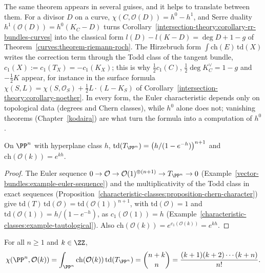 \begin{remark}\label{intersection-theory:remark-forms-of-riemann-roch}
The same theorem appears in several guises, and it helps to translate between them. For a divisor $D$ on a curve, $\chi(C, \mathcal{O}(D)) = h^0 - h^1$, and Serre duality $h^1(\mathcal{O}(D)) = h^0(K_C - D)$ turns
Corollary~\ref{intersection-theory:corollary-rr-bundles-curves} into the classical form $l(D) - l(K - D) = \deg D + 1 - g$ of Theorem~\ref{curves:theorem-riemann-roch}. The Hirzebruch form $\int\mathrm{ch}(E)\,\mathrm{td}(X)$ writes the correction
term through the Todd class of the tangent bundle, $c_1(X) := c_1(T_X) = -c_1(K_X)$; this is why $\frac12c_1(C)$, $\frac12\deg K_C^\vee = 1 - g$ and $-\frac12K$ appear, for instance in the surface formula
$\chi(S, L) = \chi(S, \mathcal{O}_S) + \frac12L \cdot (L - K_S)$ of Corollary~\ref{intersection-theory:corollary-noether}. In every form, the Euler characteristic depends only on topological data (degrees and Chern classes), while
$h^0$ alone does not; vanishing theorems (Chapter~\ref{kodaira}) are what turn the formula into a computation of $h^0$.
\end{remark}

\begin{lemma}\label{intersection-theory:lemma-todd-projective}
On $\PP^n$ with hyperplane class $h$, $\mathrm{td}(T_{\PP^n}) = \big(h/(1 - e^{-h})\big)^{n+1}$ and $\mathrm{ch}(\mathcal{O}(k)) = e^{kh}$.
\end{lemma}

\begin{proof}
The Euler sequence $0 \to \mathcal{O} \to \mathcal{O}(1)^{\oplus(n+1)} \to T_{\PP^n} \to 0$ (Example~\ref{vector-bundles:example-euler-sequence}) and the multiplicativity of the Todd class in exact sequences
(Proposition~\ref{characteristic-classes:proposition-chern-character}) give $\mathrm{td}(T)\,\mathrm{td}(\mathcal{O}) = \mathrm{td}(\mathcal{O}(1))^{n+1}$, with $\mathrm{td}(\mathcal{O}) = 1$ and $\mathrm{td}(\mathcal{O}(1)) = h/(1 - e^{-h})$,
as $c_1(\mathcal{O}(1)) = h$ (Example~\ref{characteristic-classes:example-tautological}). Also $\mathrm{ch}(\mathcal{O}(k)) = e^{c_1(\mathcal{O}(k))} = e^{kh}$.
\end{proof}

\begin{proposition}\label{intersection-theory:proposition-rr-projective}
For all $n \geq 1$ and $k \in \ZZ$,
\[
\chi(\PP^n, \mathcal{O}(k)) = \int_{\PP^n}\mathrm{ch}(\mathcal{O}(k))\,\mathrm{td}(T_{\PP^n}) = \binom{n + k}{n} = \frac{(k + 1)(k + 2)\cdots(k + n)}{n!}.
\]
\end{proposition}

